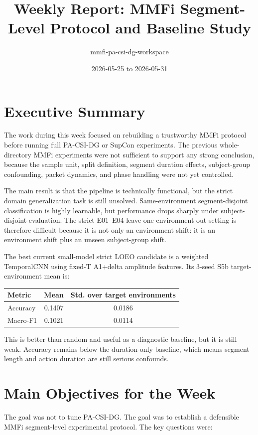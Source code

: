 \documentclass[11pt]{article}
\title{\textbf{Weekly Report: MMFi Segment-Level Protocol and Baseline Study}}
\author{mmfi-pa-csi-dg-workspace}
\date{2026-05-25 to 2026-05-31}
\begin{document}
\maketitle

\section{Executive Summary}

The work during this week focused on rebuilding a trustworthy MMFi protocol before running full PA-CSI-DG or SupCon experiments. The previous whole-directory MMFi experiments were not sufficient to support any strong conclusion, because the sample unit, split definition, segment duration effects, subject-group confounding, packet dynamics, and phase handling were not yet controlled.

The main result is that the pipeline is technically functional, but the strict domain generalization task is still unsolved. Same-environment segment-disjoint classification is highly learnable, but performance drops sharply under subject-disjoint evaluation. The strict E01--E04 leave-one-environment-out setting is therefore difficult because it is not only an environment shift: it is an environment shift plus an unseen subject-group shift.

The best current small-model strict LOEO candidate is a weighted TemporalCNN using fixed-T A1+delta amplitude features. Its 3-seed S5b target-environment mean is:

\begin{center}
\begin{tabular}{lcc}
\toprule
Metric & Mean & Std. over target environments \\
\midrule
Accuracy & 0.1407 & 0.0186 \\
Macro-F1 & 0.1021 & 0.0114 \\
\bottomrule
\end{tabular}
\end{center}

This is better than random and useful as a diagnostic baseline, but it is still weak. Accuracy remains below the duration-only baseline, which means segment length and action duration are still serious confounds.

\section{Main Objectives for the Week}

The goal was not to tune PA-CSI-DG. The goal was to establish a defensible MMFi segment-level experimental protocol. The key questions were:
\end{document}
